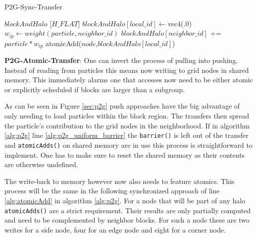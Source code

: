 \documentclass[m,times]{cgMA}
\begin{document}
\begin{algorithm}[t]
  \caption{P2G-Sync-Transfer}\label{alg:p2g}
  \begin{algorithmic}[1]
    \State {} $blockAndHalo$ [$H\_FLAT$]
      \State $blockAndHalo[local\_id] \gets $vec4(.0)
      \EndFor
      \State {}
        \label{alg:p2g_dyn_loop}
       
	\State $w_{ip} \gets weight(particle,neighbor\_id)$
	\State $blockAndHalo[neighbor\_id] $ += $ particle*w_{ip}$
	\State {}  \label{alg:p2g_uniform_barrier}
	\EndFor
      \EndFor
      \State atomicAdd($node$,$blockAndHalo[local\_id]$) \label{alg:atomicAdd}
      \EndFor
    \ENDFAP
  \end{algorithmic}
\end{algorithm}

\textbf{P2G-Atomic-Transfer}: One can invert the process of pulling into pushing. Instead of reading from particles this means now writing to grid nodes in shared memory. This immediately alarms one that accesses now need to be either atomic or explicitly scheduled if blocks are larger than a subgroup.

As can be seen in Figure \ref{sec:p2g} push approaches have the big advantage of only needing to load particles within the block region. The transfers then spread the particle's contribution to the grid nodes in the neighborhood. If in algorithm \ref{alg:p2g} line \ref{alg:p2g_uniform_barrier} the \texttt{barrier()} is left out of the transfer and \texttt{atomicAdds()} on shared memory are in use this process is straightforward to implement. One has to make sure to reset the shared memory as their contents are otherwise undefined.

The write-back to memory however now also needs to feature atomics. This process will be the same in the following synchronized approach of line \ref{alg:atomicAdd} in algorithm \ref{alg:p2g}. For a node that will be part of any halo \texttt{atomicAdds()} are a strict requirement. Their results are only partially computed and need to be complemented by neighbor blocks. For such a node these are two writes for a side node, four for an edge node and eight for a corner node.
\end{document}
